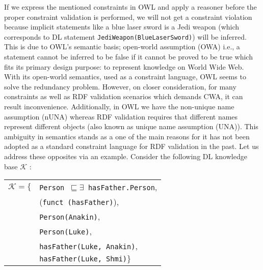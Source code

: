 \documentclass{llncs}
\newcommand{\ms}[1]{\texttt{#1}}
\newcommand{\er}[1]{\todo[size=\small, color=red!40]{\textbf{Erman:} #1}}
\newenvironment{DL}{
  \vspace{0cm}
  \begin{tabular}{r l}

}{
  \end{tabular}
}
\begin{document}
If we express the mentioned constraints in OWL %
and apply a reasoner before the proper constraint validation is performed, we will not get a constraint violation because implicit statements like a blue laser sword is a Jedi weapon  (which corresponds to DL statement \ms{JediWeapon(BlueLaserSword)}) will be inferred. This is due to OWL's semantic basis; open-world assumption (OWA)  i.e., a statement cannot be inferred to be false if it cannot be proved to be true  which fits its primary design purpose: to represent knowledge on World Wide Web. With its open-world semantics, used as a constraint language, OWL seems to solve the redundancy problem.  However, on closer consideration, for many constraints as well as RDF validation scenarios which demands CWA, it can result inconvenience. 
Additionally, in OWL we have the non-unique name assumption (nUNA) whereas RDF validation requires that different names represent different objects (also known as unique name assumption (UNA)). This ambiguity in semantics stands as a  one of the main reasons for it has not been adopted as a standard constraint language for RDF validation in the past.  Let us address these opposites via an example. Consider the following  DL knowledge base $\mathcal{K}$ : %
\begin{center}
\begin{DL} 
$\mathcal{K}=\{$ & \ms{Person $\sqsubseteq \exists$ hasFather.Person}, \\
 &(\ms{funct (hasFather)}),\\
 &\ms{Person(Anakin)},\\
  &\ms{Person(Luke)},\\
 &\ms{hasFather(Luke, Anakin)},\\ 
 &\ms{hasFather(Luke, Shmi)}$\}$
\end{DL}
\end{center}
\end{document}
